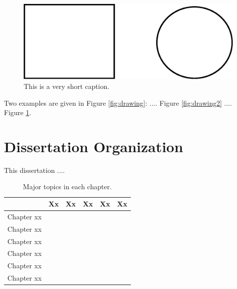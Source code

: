 \begin{figure}[htbp]
	\centering
	\includegraphics[width=0.7\linewidth]{Pics/intro/drawing}
	\caption{This is a very short caption.}
	\label{fig:drawing3}
\end{figure}

\lipsum[10-11]
Two examples are given in Figure \ref{fig:drawing}: .... Figure \ref{fig:drawing2} .... Figure \ref{fig:drawing3}.


\section{Dissertation Organization}

This dissertation ....

\begin{table}[hbp]
	\caption[Major topics in each chapter.]{Major topics in each chapter.}
	\label{tab:topic-in-chapter}
	\centering
	\begin{tabular}{l | c | c | c | c | c}
		\hline
		\quad & Xx & Xx & Xx & Xx\tablefootnote{Xxx.} & Xx \\
		\hline
		Chapter xx & \checkmark & & \checkmark & \checkmark &  \\
		\hline
		Chapter xx & \checkmark & & \checkmark & &  \\
		\hline
		Chapter xx & \checkmark & & \checkmark & & \checkmark \\
		\hline
		Chapter xx & & \checkmark & \checkmark & &  \\
		\hline
		Chapter xx & \checkmark & \checkmark & \checkmark & & \\
		\hline
		Chapter xx & \checkmark & \checkmark & & \checkmark & \checkmark\\
		\hline
	\end{tabular}
\end{table}

\lipsum[12-14]


